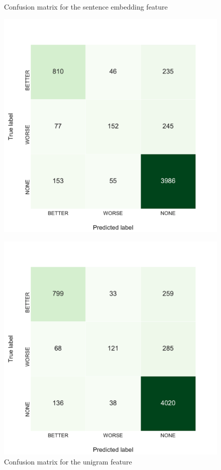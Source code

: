\begin{figure}[h]
    \begin{minipage}{.5\linewidth}
   \caption{Confusion matrix for the sentence embedding feature} 
    \label{fig:3_conf_inf}
 \centering
	\includegraphics[width=1\linewidth]{images/experiments/conf-InferSent_False}
  \end{minipage} \hfill
    \begin{minipage}{.5\linewidth}
  
     \caption{Confusion matrix for the unigram feature} 
       \label{fig:3_conf_uni}
 \centering
	\includegraphics[width=1\linewidth]{images/experiments/conf-Unigrams_False}
    \end{minipage} 
\end{figure}

